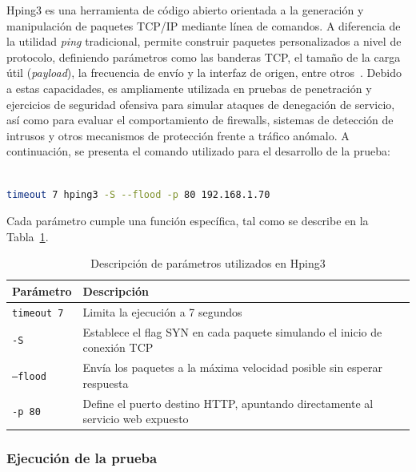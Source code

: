 Hping3 es una herramienta de código abierto orientada a la generación y manipulación de paquetes TCP/IP mediante línea de comandos. A 
diferencia de la utilidad \textit{ping} tradicional, permite construir paquetes personalizados a nivel de protocolo, definiendo 
parámetros como las banderas TCP, el tamaño de la carga útil (\textit{payload}), la frecuencia de envío y la interfaz de origen, entre 
otros~\cite{Hping3Docs}. Debido a estas capacidades, es ampliamente utilizada en pruebas de penetración y ejercicios de seguridad ofensiva para simular 
ataques de denegación de servicio, así como para evaluar el comportamiento de firewalls, sistemas de detección de intrusos y otros 
mecanismos de protección frente a tráfico anómalo. A continuación, se presenta el comando utilizado para el desarrollo de la prueba:

\begin{lstlisting}[language=bash, caption={Comando Hping3 utilizado en la prueba}, label={lst:hping3-flood}]

timeout 7 hping3 -S --flood -p 80 192.168.1.70

\end{lstlisting}

Cada parámetro cumple una función específica, tal como se describe en la Tabla~\ref{tab:parametros_hping3}.

\begin{table}[H]
	\centering
	\caption{Descripción de parámetros utilizados en Hping3}\label{tab:parametros_hping3}
	\renewcommand{\arraystretch}{1.4}
	\begin{tabular}{|p{4.2cm}|p{8.5cm}|}
	\hline
	\rowcolor{gray!25}
	\centering \textbf{Parámetro} & \centering \textbf{Descripción} \tabularnewline
	\hline

	\centering \texttt{timeout 7} &
	Limita la ejecución a 7 segundos
	\tabularnewline
	\hline

	\centering \texttt{-S} &
	Establece el flag SYN en cada paquete simulando el inicio de conexión TCP
	\tabularnewline
	\hline

	\centering \texttt{--flood} &
	Envía los paquetes a la máxima velocidad posible sin esperar respuesta
	\tabularnewline
	\hline

	\centering \texttt{-p 80} &
	Define el puerto destino HTTP, apuntando directamente al servicio web expuesto
	\tabularnewline
	\hline
	\end{tabular}
\end{table}

\subsubsection{Ejecución de la prueba}
\noindent

